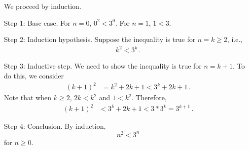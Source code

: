 \documentclass[12pt]{amsart}
\begin{document}
\begin{problem}[4.7]
We proceed by induction.

Step 1: Base case.  For $n= 0$,
$0^2 < 3^0$.
For $n = 1$, $1 < 3$.

Step 2: Induction hypothesis. Suppose the inequality is true for $n = k\geq 2$, i.e.,
\begin{align*}
	k^2 < 3^k \,.
\end{align*}

Step 3: Inductive step. We need to show the inequality is true for $n= k+1$.
To do this, we consider
\begin{align*}
	(k+1)^2 & = k^2 + 2k +1 < 3^k + 2k +1\,.
\end{align*}
Note that when $k\geq 2$, $2k < k^2$ and $1 < k^2$.
Therefore,
\begin{align*}
	(k+1)^2 & < 3^k + 2k +1 < 3*3^k = 3^{k+1}\,.
\end{align*}

Step 4: Conclusion. By induction,
\begin{equation*}
	n^2 < 3^n
\end{equation*}
for $n \geq 0$.
\end{problem}


%
%
\end{document}
